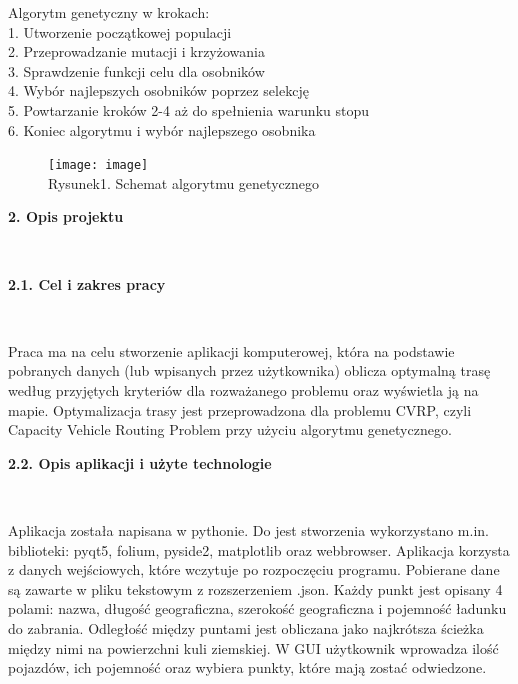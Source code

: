 \documentclass[a4paper, twoside, 12pt, justified]{article}
\begin{document}
	Algorytm genetyczny w krokach:\\
	1. Utworzenie początkowej populacji\\
	2. Przeprowadzanie mutacji i krzyżowania\\
	3. Sprawdzenie funkcji celu dla osobników\\
	4. Wybór najlepszych osobników poprzez selekcję\\
	5. Powtarzanie kroków 2-4 aż do spełnienia warunku stopu\\
	6. Koniec algorytmu i wybór najlepszego osobnika
	
	\vspace{10mm}
	
	
	\begin{figure}[h]
	\texttt{[image: image]}
	\centering
	\\
	{Rysunek1. Schemat algorytmu genetycznego} 
	\end{figure}
	
	
	
	\newpage
	\begin{large}\textbf{2. Opis projektu}\end{large}\\
	\vspace{5mm} %
	
	\begin{large}\textbf{2.1. Cel i zakres pracy}\end{large}\\
	\vspace{10mm} %
	
	\hspace{5mm}Praca ma na celu stworzenie
	 aplikacji komputerowej, która na podstawie pobranych danych (lub wpisanych przez użytkownika) oblicza optymalną trasę według przyjętych kryteriów dla rozważanego problemu oraz wyświetla ją na mapie. Optymalizacja trasy jest przeprowadzona dla problemu CVRP, czyli Capacity Vehicle Routing Problem przy użyciu algorytmu genetycznego. 
	 \vspace{10mm}
	 
	 \begin{large}\textbf{2.2. Opis aplikacji i użyte technologie}\end{large}\\
	 \vspace{10mm} %
	 
	 Aplikacja została napisana w pythonie. Do jest stworzenia wykorzystano m.in. biblioteki: pyqt5, folium, pyside2, matplotlib oraz webbrowser. Aplikacja korzysta z danych wejściowych, które wczytuje po rozpoczęciu programu. Pobierane dane są zawarte w pliku tekstowym z rozszerzeniem .json. Każdy punkt jest opisany 4 polami: nazwa, długość geograficzna, szerokość geograficzna i pojemność ładunku do zabrania. Odległość między puntami jest obliczana jako najkrótsza ścieżka między nimi na powierzchni kuli ziemskiej. W GUI użytkownik wprowadza ilość pojazdów, ich pojemność oraz wybiera punkty, które mają zostać odwiedzone.
	
\end{document}
